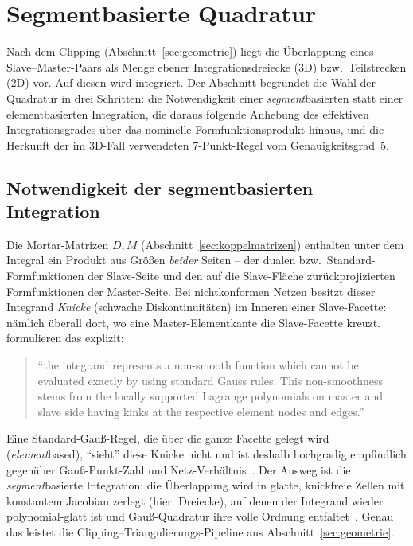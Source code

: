 \documentclass[a4paper,11pt]{article}
\def\bm#1{#1}%
\let\stdsection\section
\renewcommand{\section}{\clearpage\stdsection}
\begin{document}
\section{Segmentbasierte Quadratur}
\label{sec:quadratur}

Nach dem Clipping (Abschnitt~\ref{sec:geometrie}) liegt die Überlappung eines Slave--Master-Paars
als Menge ebener Integrationsdreiecke (3D) bzw.\ Teilstrecken (2D) vor. Auf diesen wird integriert.
Der Abschnitt begründet die Wahl der Quadratur in drei Schritten: die Notwendigkeit einer
\emph{segment}basierten statt einer elementbasierten Integration, die daraus folgende Anhebung des
effektiven Integrationsgrades über das nominelle Formfunktionsprodukt hinaus, und die Herkunft der
im 3D-Fall verwendeten 7-Punkt-Regel vom Genauigkeitsgrad~5.

\subsection{Notwendigkeit der segmentbasierten Integration}
Die Mortar-Matrizen $\bm D,\bm M$ (Abschnitt~\ref{sec:koppelmatrizen}) enthalten unter dem Integral
ein Produkt aus Größen \emph{beider} Seiten -- der dualen bzw.\ Standard-Formfunktionen der
Slave-Seite und den auf die Slave-Fläche zurückprojizierten Formfunktionen der Master-Seite. Bei
nichtkonformen Netzen besitzt dieser Integrand \emph{Knicke} (schwache Diskontinuitäten) im Inneren
einer Slave-Facette: nämlich überall dort, wo eine Master-Elementkante die Slave-Facette kreuzt.
\citet{farah2015} formulieren das explizit:
\begin{quote}
\small ``the integrand represents a non-smooth function which cannot be evaluated exactly by using
standard Gauss rules. This non-smoothness stems from the locally supported Lagrange polynomials on
master and slave side having kinks at the respective element nodes and edges.''
\hfill \citep[S.~214]{farah2015}
\end{quote}
Eine Standard-Gauß-Regel, die über die ganze Facette gelegt wird (\emph{element}based), ``sieht''
diese Knicke nicht und ist deshalb hochgradig empfindlich gegenüber Gauß-Punkt-Zahl und
Netz-Verhältnis~\citep[S.~217]{farah2015}. Der Ausweg ist die \emph{segment}basierte Integration:
die Überlappung wird in glatte, knickfreie Zellen mit konstantem Jacobian zerlegt (hier: Dreiecke),
auf denen der Integrand wieder polynomial-glatt ist und Gauß-Quadratur ihre volle Ordnung
entfaltet~\citep[Abschn.~3.1]{farah2015}. Genau das leistet die Clipping--Triangulierungs-Pipeline aus
Abschnitt~\ref{sec:geometrie}.
\end{document}

